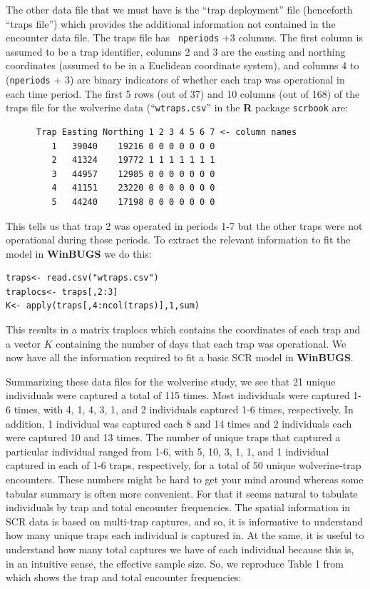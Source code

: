 The other data file that we must have is the ``trap deployment'' file
(henceforth ``traps file'') which provides the additional information
not contained in the encounter data file. The traps file has \mbox{\tt
  nperiods} $+ 3$ columns. The first column is assumed to be a trap identifier,
columns 2 and 3 are the easting and northing coordinates (assumed to
be in a Euclidean coordinate system), and columns 4 to (\mbox{\tt nperiods} + 3)
are binary indicators of whether each trap was operational in each
time period. The first 5 rows (out of 37) and 10 columns (out of 168)
of the traps file for the wolverine data (``\mbox{\tt wtraps.csv}'' in
the {\bf R} package \mbox{\tt scrbook} are:
\begin{verbatim}
      Trap Easting Northing 1 2 3 4 5 6 7 <- column names
         1   39040    19216 0 0 0 0 0 0 0
         2   41324    19772 1 1 1 1 1 1 1
         3   44957    12985 0 0 0 0 0 0 0
         4   41151    23220 0 0 0 0 0 0 0
         5   44240    17198 0 0 0 0 0 0 0
\end{verbatim}
This tells us that trap 2 was operated in periods 1-7 but the other
traps were not operational during those periods. To extract the
relevant information to fit the model in {\bf WinBUGS} we do this:
\begin{verbatim}
traps<- read.csv("wtraps.csv")
traplocs<- traps[,2:3]
K<- apply(traps[,4:ncol(traps)],1,sum)
\end{verbatim}
This results in a matrix traplocs which contains the coordinates of
each trap and a vector $K$ containing the number of days that each trap
was operational. We now have all the information required to fit a
basic SCR model in {\bf WinBUGS}.

Summarizing these data files for the wolverine study, we see that 21
unique individuals were captured a total of 115 times. Most
individuals were captured 1-6 times, with 4, 1, 4, 3, 1, and 2
individuals captured 1-6 times, respectively.  In addition, 1
individual was captured each 8 and 14 times and 2 individuals each
were captured 10 and 13 times.  The number of unique traps that
captured a particular individual ranged from 1-6, with 5, 10, 3, 1, 1,
and 1 individual captured in each of 1-6 traps, respectively, for a
total of 50 unique wolverine-trap encounters.  These numbers might be
hard to get your mind around whereas some tabular summary is often
more convenient. For that it seems natural to tabulate individuals by
trap and total encounter frequencies. The spatial information in SCR
data is based on multi-trap captures, and so, it is informative to
understand how many unique traps each individual is captured in. At
the same, it is useful to understand how many total captures we have
of each individual because this is, in an intuitive sense, the
effective sample size.  So, we reproduce Table 1 from
\citet{royle_etal:2011} which shows the trap and total encounter
frequencies:

